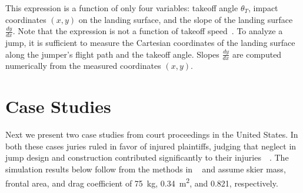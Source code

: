 \documentclass{article}
\begin{document}
This expression is  a function of only four variables: takeoff angle
$\theta_T$, impact coordinates $(x,y)$ on the landing surface, and the slope of
the landing surface $\frac{dy}{dx}$. Note that the expression is not a function
of takeoff speed~\cite{Petrone2017}. To analyze a jump, it is sufficient to
measure the Cartesian coordinates of the landing surface along the jumper's
flight path and the takeoff angle. Slopes $\frac{dy}{dx}$ are computed
numerically from the measured coordinates $(x,y)$.

\section{Case Studies}
%
Next we present two case studies from court proceedings in the United States.
In both these cases juries ruled in favor of injured plaintiffs, judging that
neglect in jump design and construction contributed significantly to their
injuries~\cite{Alvarado2002}~\cite{Salvini2008}. The simulation results below
follow from the methods in ~\cite{Levy2015} and assume skier mass, frontal
area, and drag coefficient of 75~\si{\kg}, 0.34~\si{\meter\squared}, and 0.821,
respectively.
\end{document}
